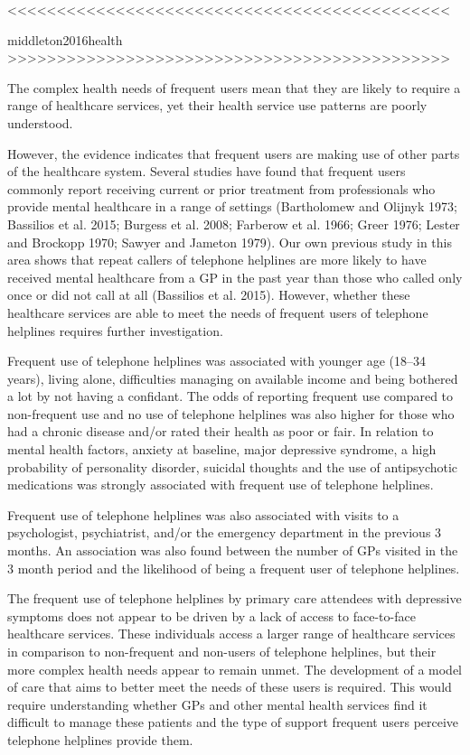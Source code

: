 <<<<<<<<<<<<<<<<<<<<<<<<<<<<<<<<<<<<<<<<<<<<<


middleton2016health
>>>>>>>>>>>>>>>>>>>>>>>>>>>>>>>>>>>>>>>>>>>>>

The complex health needs of frequent users mean that they are likely to require a range of healthcare services, yet their health service use patterns are poorly understood. 

However, the evidence indicates that frequent users are making use of other parts of the healthcare system. Several studies have found that frequent users commonly report receiving current or prior treatment from professionals who provide mental healthcare in a range of settings (Bartholomew and Olijnyk 1973; Bassilios et al. 2015; Burgess et al. 2008; Farberow et al. 1966; Greer 1976; Lester and Brockopp 1970; Sawyer and Jameton 1979). Our own previous study in this area shows that repeat callers of telephone helplines are more likely to have received mental healthcare from a GP in the past year than those who called only once or did not call at all (Bassilios et al. 2015). However, whether these healthcare services are able to meet the needs of frequent users of telephone helplines requires further investigation.

Frequent use of telephone helplines was associated with younger age (18–34 years), living alone, difficulties managing on available income and being bothered a lot by not having a confidant. The odds of reporting frequent use compared to non-frequent use and no use of telephone helplines was also higher for those who had a chronic disease and/or rated their health as poor or fair. In relation to mental health factors, anxiety at baseline, major depressive syndrome, a high probability of personality disorder, suicidal thoughts and the use of antipsychotic medications was strongly associated with frequent use of telephone helplines.

Frequent use of telephone helplines was also associated with visits to a psychologist, psychiatrist, and/or the emergency department in the previous 3 months. An association was also found between the number of GPs visited in the 3 month period and the likelihood of being a frequent user of telephone helplines.

The frequent use of telephone helplines by primary care attendees with depressive symptoms does not appear to be driven by a lack of access to face-to-face healthcare services. These individuals access a larger range of healthcare services in comparison to non-frequent and non-users of telephone helplines, but their more complex health needs appear to remain unmet. The development of a model of care that aims to better meet the needs of these users is required. This would require understanding whether GPs and other mental health services find it difficult to manage these patients and the type of support frequent users perceive telephone helplines provide them.

